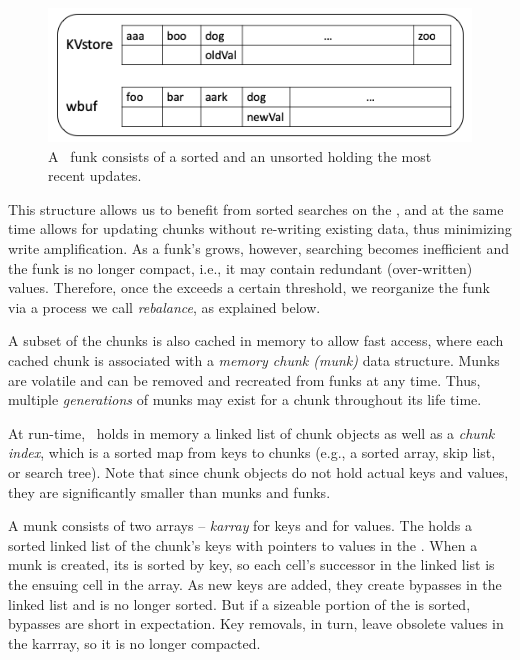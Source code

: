 \begin{figure}[htb]
\centerline{
\includegraphics[width=\columnwidth]{funk.png}
}
\caption{A \sys\ funk consists of a sorted  and an unsorted  holding the most recent updates.}
\label{fig:funk}
\end{figure}

This structure allows us to benefit from sorted searches on the , and at the same time
allows for updating chunks without re-writing existing data, thus minimizing write amplification.
As a funk's   grows, however, searching becomes inefficient   and  
the funk is no longer compact, i.e., it may contain redundant (over-written) values.
Therefore, once the   exceeds a certain threshold, we reorganize the funk
via a process we call \emph{rebalance}, as explained below.



A subset of the chunks is also cached in memory to allow fast access, where each cached chunk is associated with a
\emph{memory chunk (munk)}  data structure. 
Munks are volatile and can be removed and recreated from funks at any time.
Thus, multiple \emph{generations} of munks may exist for a chunk throughout its life time.


At run-time, \sys\ holds in memory a linked list of chunk objects as well as 
a \emph{chunk index}, which is a sorted map from keys to chunks (e.g., a sorted array, skip list, or search tree).
Note that since chunk objects do not hold actual keys and values, they are significantly smaller than munks and funks. 


A munk consists of two arrays -- \emph{karray} for keys and \emph{} for values. The    holds a sorted linked list of the chunk's keys
with pointers to values in the . 
When a munk is created, its    is sorted by key, so each cell's successor in the linked list is the ensuing cell in the array.
As new keys are added, they create bypasses in the linked list and    is no longer sorted.
But if a sizeable portion of the    is sorted, bypasses are short in expectation.
Key removals, in turn, leave obsolete values in the karrray, so it is no longer compacted.

